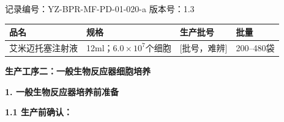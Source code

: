 \documentclass[UTF8,10pt,a4paper,fontset=fandol]{ctexart}
\newcommand{\fieldvalue}[1]{#1}
\newcommand{\handwritten}[1]{#1}
\begin{document}
\noindent
记录编号：YZ-BPR-MF-PD-01-020-a \hfill 版本号：1.3

\begin{center}
\begin{tabularx}{\textwidth}{|X|X|X|X|}
\hline
品名 & 规格 & 生产批号 & 批量\\
\hline
艾米迈托塞注射液 & 12ml；$6.0\times10^{7}$个细胞 &
\fieldvalue{\handwritten{[批号，难辨]}} &
200--480袋\\
\hline
\end{tabularx}
\end{center}

\noindent\textbf{生产工序二：一般生物反应器细胞培养}

\medskip
\noindent\textbf{1. 一般生物反应器培养前准备}

\medskip
\noindent\textbf{1.1 生产前确认：}
\end{document}
